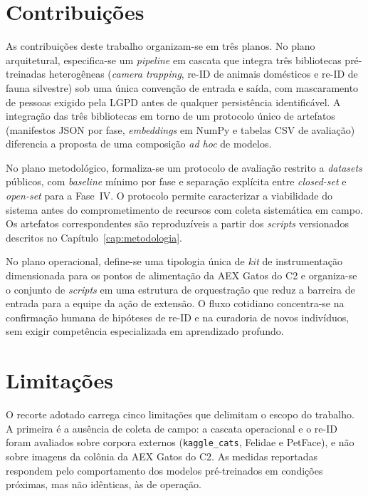 \section{Contribuições}
\label{sec:conclusao-contribuicoes}

As contribuições deste trabalho organizam-se em três planos. No plano arquitetural, especifica-se um \textit{pipeline} em cascata que integra três bibliotecas pré-treinadas heterogêneas (\textit{camera trapping}, re-ID de animais domésticos e re-ID de fauna silvestre) sob uma única convenção de entrada e saída, com mascaramento de pessoas exigido pela LGPD antes de qualquer persistência identificável. A integração das três bibliotecas em torno de um protocolo único de artefatos (manifestos JSON por fase, \textit{embeddings} em NumPy e tabelas CSV de avaliação) diferencia a proposta de uma composição \textit{ad hoc} de modelos.

No plano metodológico, formaliza-se um protocolo de avaliação restrito a \textit{datasets} públicos, com \textit{baseline} mínimo por fase e separação explícita entre \textit{closed-set} e \textit{open-set} para a Fase~IV. O protocolo permite caracterizar a viabilidade do sistema antes do comprometimento de recursos com coleta sistemática em campo. Os artefatos correspondentes são reproduzíveis a partir dos \textit{scripts} versionados descritos no Capítulo~\ref{cap:metodologia}.

No plano operacional, define-se uma tipologia única de \textit{kit} de instrumentação dimensionada para os pontos de alimentação da AEX Gatos do C2 e organiza-se o conjunto de \textit{scripts} em uma estrutura de orquestração que reduz a barreira de entrada para a equipe da ação de extensão. O fluxo cotidiano concentra-se na confirmação humana de hipóteses de re-ID e na curadoria de novos indivíduos, sem exigir competência especializada em aprendizado profundo.


\section{Limitações}
\label{sec:conclusao-limitacoes}

O recorte adotado carrega cinco limitações que delimitam o escopo do trabalho. A primeira é a ausência de coleta de campo: a cascata operacional e o re-ID foram avaliados sobre corpora externos (\texttt{kaggle\_cats}, Felidae e PetFace), e não sobre imagens da colônia da AEX Gatos do C2. As medidas reportadas respondem pelo comportamento dos modelos pré-treinados em condições próximas, mas não idênticas, às de operação.

